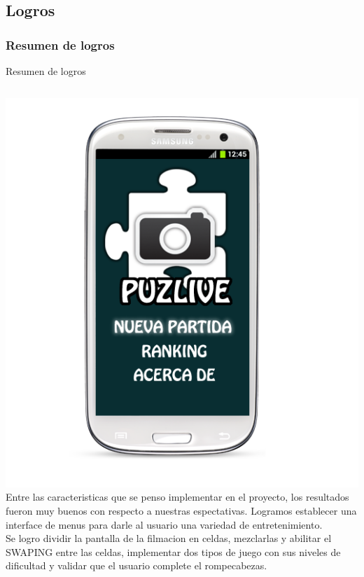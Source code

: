 \documentclass[serif,11pt]{beamer}
\begin{document}
		\subsection{Logros}
		
			\begin{frame}\frametitle{Resumen de logros}
				\pause \bigskip
				\begin{block}{Resumen de logros}
					\begin{columns}
						 \hspace{0.1cm}
						\includegraphics[width=1\textwidth]{androidpro4} 
						Entre las caracteristicas que se penso implementar en el proyecto, los resultados fueron muy buenos con respecto
						a nuestras espectativas. Logramos establecer una interface de menus para darle al usuario una variedad de entretenimiento. 
						\\Se logro dividir la pantalla de la filmacion en celdas, mezclarlas y abilitar el SWAPING entre las celdas, 
						implementar dos tipos de juego con sus niveles de dificultad y  validar que el usuario complete el rompecabezas.
						
					\end{columns}
				\end{block}
			\end{frame}
\end{document}
